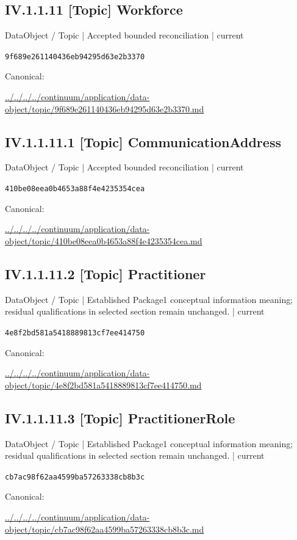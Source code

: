 \documentclass[10pt,a4paper]{article}
\begin{document}
\subsection*{IV.1.1.11 [Topic] Workforce}
{\small DataObject / Topic | Accepted bounded reconciliation | current}\par
\texttt{9f689e261140436eb94295d63e2b3370}\par
Canonical: \par
{\footnotesize\url{../../../../continuum/application/data-object/topic/9f689e261140436eb94295d63e2b3370.md}}\par
\subsection*{IV.1.1.11.1 [Topic] CommunicationAddress}
{\small DataObject / Topic | Accepted bounded reconciliation | current}\par
\texttt{410be08eea0b4653a88f4e4235354cea}\par
Canonical: \par
{\footnotesize\url{../../../../continuum/application/data-object/topic/410be08eea0b4653a88f4e4235354cea.md}}\par
\subsection*{IV.1.1.11.2 [Topic] Practitioner}
{\small DataObject / Topic | Established Package1 conceptual information meaning; residual qualifications in selected section remain unchanged. | current}\par
\texttt{4e8f2bd581a5418889813cf7ee414750}\par
Canonical: \par
{\footnotesize\url{../../../../continuum/application/data-object/topic/4e8f2bd581a5418889813cf7ee414750.md}}\par
\subsection*{IV.1.1.11.3 [Topic] PractitionerRole}
{\small DataObject / Topic | Established Package1 conceptual information meaning; residual qualifications in selected section remain unchanged. | current}\par
\texttt{cb7ac98f62aa4599ba57263338cb8b3c}\par
Canonical: \par
{\footnotesize\url{../../../../continuum/application/data-object/topic/cb7ac98f62aa4599ba57263338cb8b3c.md}}\par
\end{document}
